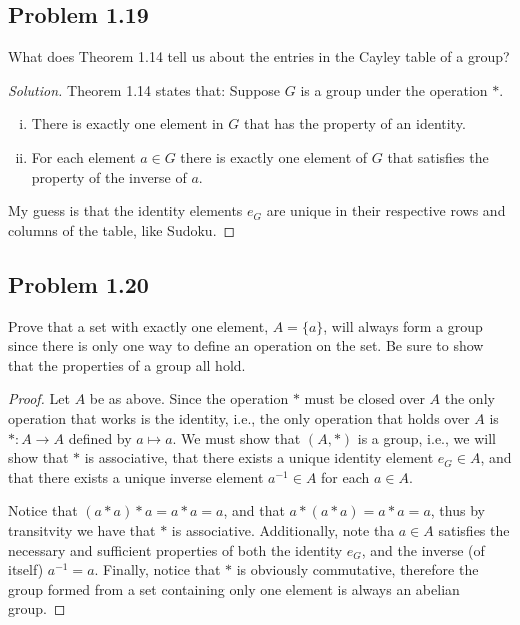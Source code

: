 \documentclass{amsbook}
\begin{document}
			\subsection*{Problem 1.19}
			\label{sub:problem_1_19}
			What does Theorem 1.14 tell us about the entries in the Cayley table of a group?
			\begin{proof}[Solution]
			Theorem 1.14 states that: Suppose $G$ is a group under the operation $*$.
			\begin{enumerate}[(i)]
				\item There is exactly one element in $G$ that has the property of an identity.
				\item For each element $a \in G$ there is exactly one element of $G$ that satisfies the property of the inverse of $a$.
			\end{enumerate}
			
			My guess is that the identity elements $e_{G}$ are unique in their respective rows and columns of the table, like Sudoku.
			\end{proof}

			\subsection*{Problem 1.20}
			\label{sub:problem_1_20}
			Prove that a set with exactly one element, $A = \{a\}$, will always form a group since there is only one way to define an operation on the set. 
			Be sure to show that the properties of a group all hold.
			\begin{proof} Let $A$ be as above.
			Since the operation $*$ must be closed over $A$ the only operation that works is the identity, i.e., the only operation that holds over $A$ is $*:A \to A$ defined by $a \mapsto a$.
			We must show that $(A, *)$ is a group, i.e., we will show that $*$ is associative, that there exists a unique identity element $e_{G} \in A$, and that there exists a unique inverse element $a^{-1} \in A$ for each $a \in A$.

			Notice that $(a*a)*a = a * a = a$, and that $a*(a*a) = a * a = a$, thus by transitvity we have that $*$ is associative.
			Additionally, note tha $a \in A$ satisfies the necessary and sufficient properties of both the identity $e_{G}$, and the inverse (of itself) $a^{-1} = a$.
			Finally, notice that $*$ is obviously commutative, therefore the group formed from a set containing only one element is always an abelian group.
			\end{proof}
\end{document}
